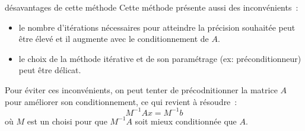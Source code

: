\begin{remarque}{}{désavantages de cette méthode}
    Cette méthode présente aussi des inconvénients~:
    \begin{itemize}
        \item le nombre d'itérations nécessaires pour atteindre la précision souhaitée peut être élevé et il augmente avec le conditionnement de $A$.
        \item le choix de la méthode itérative et de son paramétrage (ex: préconditionneur) peut être délicat.
    \end{itemize}
    Pour éviter ces inconvénients, on peut tenter de précodnitionner la matrice $A$ pour améliorer son conditionnement, ce qui revient à résoudre~:
    $$M^{-1}Ax = M^{-1}b$$
    où $M$ est un  choisi pour que $M^{-1}A$ soit mieux conditionnée que $A$.
\end{remarque}

